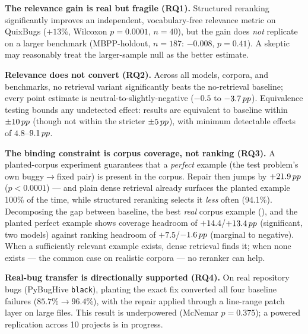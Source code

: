 \textbf{The relevance gain is real but fragile (RQ1).} Structured reranking
significantly improves an independent, vocabulary-free relevance metric on
QuixBugs ($+13\%$, Wilcoxon $p{=}0.0001$, $n{=}40$), but the gain does
\emph{not} replicate on a larger benchmark (MBPP-holdout, $n{=}187$: $-0.008$,
$p{=}0.41$). A skeptic may reasonably treat the larger-sample null as the
better estimate.

\textbf{Relevance does not convert (RQ2).} Across all models, corpora, and
benchmarks, no retrieval variant significantly beats the no-retrieval
baseline; every point estimate is neutral-to-slightly-negative ($-0.5$ to
$-3.7\,pp$). Equivalence testing bounds any undetected effect: results are
equivalent to baseline within $\pm 10\,pp$ (though not within the stricter
$\pm 5\,pp$), with minimum detectable effects of $4.8$--$9.1\,pp$.

\textbf{The binding constraint is corpus coverage, not ranking (RQ3).} A
planted-corpus experiment guarantees that a \emph{perfect} example (the test
problem's own buggy$\to$fixed pair) is present in the corpus. Repair then
jumps by $+21.9\,pp$ ($p{<}0.0001$) --- and plain dense retrieval already
surfaces the planted example 100\% of the time, while structured reranking
selects it \emph{less} often (94.1\%). Decomposing the gap between baseline,
the best \emph{real} corpus example (\oraclecorpus), and the planted perfect
example shows coverage headroom of $+14.4$/$+13.4\,pp$ (significant, two
models) against ranking headroom of $+7.5$/$-1.6\,pp$ (marginal to negative).
When a sufficiently relevant example exists, dense retrieval finds it; when
none exists --- the common case on realistic corpora --- no reranker can help.

\textbf{Real-bug transfer is directionally supported (RQ4).} On real
repository bugs (PyBugHive \texttt{black}), planting the exact fix converted
all four baseline failures ($85.7\%{\to}96.4\%$), with the repair applied
through a line-range patch layer on large files. This result is underpowered
(McNemar $p{=}0.375$);
a powered replication across 10 projects is in progress.

